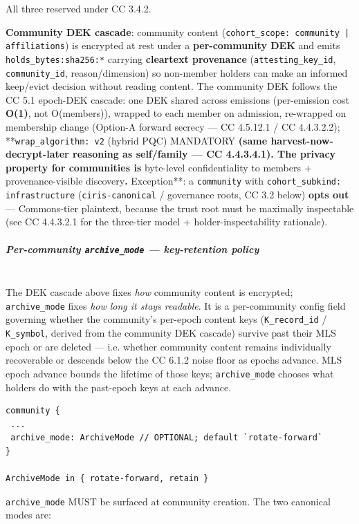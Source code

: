 \documentclass[11pt]{article}
\begin{document}
All three reserved under CC 3.4.2.


\textbf{Community DEK cascade}: community content (\texttt{cohort\_scope: community | affiliations}) is encrypted at rest under a \textbf{per-community DEK} and emits \texttt{holds\_bytes:sha256:*} carrying \textbf{cleartext provenance} (\texttt{attesting\_key\_id}, \texttt{community\_id}, reason/dimension) so non-member holders can make an informed keep/evict decision without reading content. The community DEK follows the CC 5.1 epoch-DEK cascade: one DEK shared across emissions (per-emission cost \textbf{O(1)}, not O(members)), wrapped to each member on admission, re-wrapped on membership change (Option-A forward secrecy — CC 4.5.12.1 / CC 4.4.3.2.2); **\texttt{wrap\_algorithm: v2} (hybrid PQC) MANDATORY\textbf{ (same harvest-now-decrypt-later reasoning as self/family — CC 4.4.3.4.1). The privacy property for communities is }byte-level confidentiality to members + provenance-visible discovery\textbf{. }Exception**: a \texttt{community} with \texttt{cohort\_subkind: infrastructure} (\texttt{ciris-canonical} / governance roots, CC 3.2 below) \textbf{opts out} — Commons-tier plaintext, because the trust root must be maximally inspectable (see CC 4.4.3.2.1 for the three-tier model + holder-inspectability rationale).


\subparagraph{Per-community \texttt{archive\_mode} — key-retention policy}\mbox{}\\


The DEK cascade above fixes \textit{how} community content is encrypted; \texttt{archive\_mode} fixes \textit{how long it stays readable}. It is a per-community config field governing whether the community's per-epoch content keys (\texttt{K\_record\_id} / \texttt{K\_symbol}, derived from the community DEK cascade) survive past their MLS epoch or are deleted — i.e. whether community content remains individually recoverable or descends below the CC 6.1.2 noise floor as epochs advance. MLS epoch advance bounds the lifetime of those keys; \texttt{archive\_mode} chooses what holders do with the past-epoch keys at each advance.


\begin{lstlisting}
community {
 ...
 archive_mode: ArchiveMode // OPTIONAL; default `rotate-forward`
}

ArchiveMode in { rotate-forward, retain }
\end{lstlisting}

\texttt{archive\_mode} MUST be surfaced at community creation. The two canonical modes are:
\end{document}
